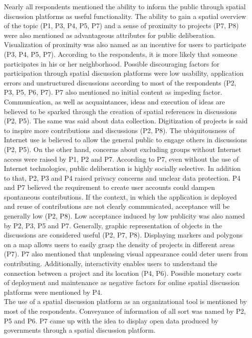 Nearly all respondents mentioned the ability to inform the public through spatial discussion platforms as useful functionality. The ability to gain a spatial overview of the topic (P1, P3, P4, P5, P7) and a sense of proximity to projects (P7, P8) were also mentioned as advantageous attributes for public deliberation. Visualization of proximity was also named as an incentive for users to participate (P3, P4, P5, P7). According to the respondents, it is more likely that someone participates in his or her neighborhood. Possible discouraging factors for participation through spatial discussion platforms were low usability, application errors and unstructured discussions according to most of the respondents (P2, P3, P5, P6, P7). P7 also mentioned no initial content as impeding factor. Communication, as well as acquaintances, ideas and execution of ideas are believed to be sparked through the creation of spatial references in discussions (P2, P5). The same was said about data collection. Digitization of projects is said to inspire more contributions and discussions (P2, P8). The ubiquitousness of Internet use is believed to allow the general public to engage others in discussions (P2, P5). On the other hand, concerns about excluding groups without Internet access were raised by P1, P2 and P7. According to P7, even without the use of Internet technologies, public deliberation is highly socially selective. In addition to that, P2, P3 and P4 raised privacy concerns and unclear data protection. P4 and P7 believed the requirement to create user accounts could dampen spontaneous contributions. If the context, in which the application is deployed and reuse of contributions are not clearly communicated, acceptance will be generally low (P2, P8). Low acceptance induced by low publicity was also named by P2, P3, P5 and P7. Generally, graphic representation of objects in the discussions are considered useful (P2, P7, P8). Displaying markers and polygons on a map allows users to easily grasp the density of projects in different areas (P7). P7 also mentioned that unpleasing visual appearance could deter users from contributing. Additionally, interactivity enables users to understand the connection between a project and its location (P4, P6). Possible monetary costs of deployment and maintenance as negative factors for online spatial discussion platforms were mentioned by P4.\\
The use of a spatial discussion platform as an organizational tool is mentioned by most of the respondents. Conveyance of information of all sort was named by P2, P5 and P6. P7 came up with the idea to display open data produced by governments through a spatial discussion platform.


